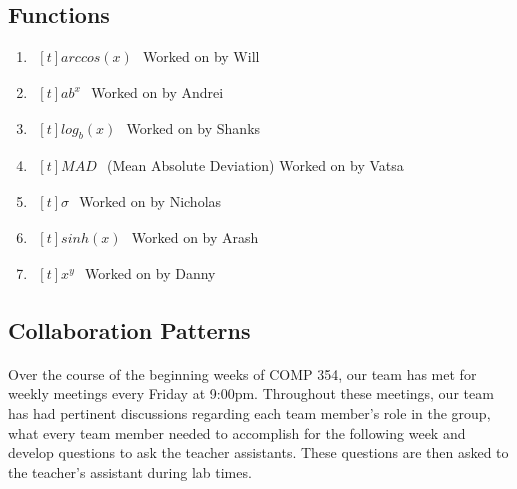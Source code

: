 \documentclass[titlepage]{article}
\begin{document}
    \subsection{Functions}
        \begin{enumerate}
            \item $\begin{aligned}[t]
                arccos(x)
            \end{aligned}$
                Worked on by Will
            \item $\begin{aligned}[t]
                ab^x
            \end{aligned}$
                Worked on by Andrei
            \item $\begin{aligned}[t]
                log_{b}(x)
            \end{aligned}$
                Worked on by Shanks
            \item $\begin{aligned}[t]
                MAD
            \end{aligned}$
                (Mean Absolute Deviation) Worked on by Vatsa
            \item $\begin{aligned}[t]
                \sigma
            \end{aligned}$
                Worked on by Nicholas
            \item $\begin{aligned}[t]
                sinh(x)
            \end{aligned}$
                Worked on by Arash
            \item $\begin{aligned}[t]
                x^y
            \end{aligned}$
                Worked on by Danny
        \end{enumerate}

    \subsection{Collaboration Patterns}
        \paragraph{}
        Over the course of the beginning weeks of COMP 354, our team has met for weekly meetings every Friday at 9:00pm. Throughout these meetings, our team has had pertinent discussions regarding each team member’s role in the group, what every team member needed to accomplish for the following week and develop questions to ask the teacher assistants. These questions are then asked to the teacher’s assistant during lab times.
        
\end{document}
